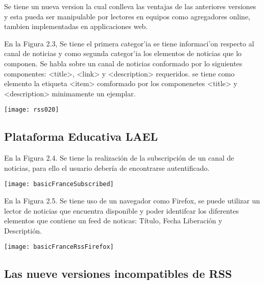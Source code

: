 Se tiene un nueva version la cual conlleva las ventajas de las anteriores versiones y esta pueda ser manipulable por
lectores en equipos como agregadores online, tambien implementadas en applicaciones web.

En la Figura 2.3, Se tiene el primera categor'{i}a se tiene informaci'{o}n respecto al canal de noticias y como segunda
categor'{i}a los elementos de noticias que lo componen. Se habla sobre un canal de noticias conformado por lo siguientes
componentes: <title>, <link> y <description> requeridos. se tiene como elemento la etiqueta <item> comformado por los
componenetes <title> y <description> minimamente un ejemplar.

\begin{minipage}{1.0\linewidth}
	\centering
	\texttt{[image: rss020]}
\end{minipage}

\subsection{Plataforma Educativa LAEL}

En la Figura 2.4. Se tiene la realizaci\'{o}n de la subscripci\'{o}n de un canal de noticias, para ello el usuario deber\'{i}a
de encontrarse autentificado. 

\begin{minipage}{1.0\linewidth}
\centering
\texttt{[image: basicFranceSubscribed]}
\end{minipage}

En la Figura 2.5. Se tiene uso de un navegador como Firefox, se puede utilizar un lector de noticias que encuentra disponible
y poder identifcar los diferentes elementos que contiene un feed de noticas: T\'{i}tulo, Fecha Liberaci\'{o}n
y Descripti\'{o}n.
 
\begin{minipage}{1.0\linewidth}
\centering
\texttt{[image: basicFranceRssFirefox]}
\end{minipage}


\subsection{Las nueve versiones incompatibles de RSS}

